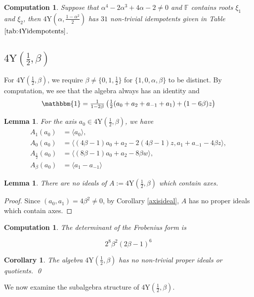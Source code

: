 \documentclass[11pt, a4paper]{article}
\theoremstyle{plain}
\newtheorem{corollary}[theorem]{Corollary}
\newtheorem{lemma}[theorem]{Lemma}
\newtheorem{computation}[theorem]{Computation}
\theoremstyle{definition}
\newcommand\al{\alpha}
\newcommand\bt{\beta}
\newcommand\la{\langle}
\newcommand\ra{\rangle}
\newcommand\FF{\mathbb{F}}
\newcommand{\Y}{\mathrm{Y}}
\newcommand{\0}{\overline{0}}
\newcommand{\2}{\overline{2}}
\newcommand{\1}{\mathbbm{1}}
\newcommand{\rt}{\xi}
\begin{document}
\begin{computation}
Suppose that $\al^4-2\al^3+4\al-2 \neq 0$ and $\FF$ contains roots $\rt_1$ and $\rt_2$, then $4\Y(\al, \frac{1-\al^2}{2})$ has $31$ non-trivial idempotents given in Table $\ref{tab:4Yidempotents}$.
\end{computation}


\subsection{$4\Y(\frac{1}{2}, \bt)$}

For $4\Y(\frac{1}{2}, \bt)$, we require $\bt  \neq \{0,1, \frac{1}{2}\}$ for $\{1,0,\al,\bt\}$ to be distinct.  By computation, we see that the algebra always has an identity and
\[
\1 = \tfrac{1}{1-2\bt }\left( \tfrac{1}{2}(a_0 +a_2 +a_{-1}+ a_1) + (1-6\bt)z \right)
\]

\begin{lemma}
	For the axis $ a_0 \in 4\Y(\frac{1}{2}, \bt)$, we have
	\begin{align*}
		A_1(a_0) &= \la a_0 \ra, \\	
		A_0(a_0) &= \la (4\bt-1)a_0 + a_2 - 2(4\bt-1) z, a_1 +a_{-1} -4\bt z \ra, \\
		A_{\frac{1}{2}}(a_0) &= \la (8\bt-1)a_0 + a_2 -8 \bt w \ra, \\
		A_{\bt}(a_0) &= \la a_1 - a_{-1} \ra 
	\end{align*}
\end{lemma}

\begin{lemma}
	There are no ideals of $A := 4\Y(\frac{1}{2}, \bt)$ which contain axes.
\end{lemma}
\begin{proof}
Since $(a_0, a_1) =  4\bt^2 \neq 0$, by Corollary \ref{axisideal}, $A$ has no proper ideals which contain axes.
\end{proof}

\begin{computation}
	The determinant of the Frobenius form is
	
	\[
	2^8  \bt^2  (2\bt - 1)^6
	\]
\end{computation}

\begin{corollary}
The algebra $4\Y(\frac{1}{2}, \bt)$ has no non-trivial proper ideals or quotients.
\qed
\end{corollary}


We now examine the subalgebra structure of $4\Y(\frac{1}{2}, \bt)$. 
\end{document}
